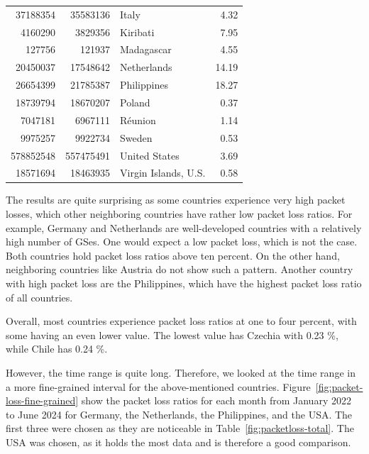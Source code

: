 \begin{table}
\begin{tabular}{rrlr}
		37188354  & 35583136  & Italy                       & 4.32   \\
		4160290   & 3829356   & Kiribati                    & 7.95   \\
		127756    & 121937    & Madagascar                  & 4.55   \\
		20450037  & 17548642  & Netherlands                 & 14.19  \\
		26654399  & 21785387  & Philippines                 & 18.27  \\
		18739794  & 18670207  & Poland                      & 0.37   \\
		7047181   & 6967111   & Réunion                     & 1.14   \\
		9975257   & 9922734   & Sweden                      & 0.53   \\
		578852548 & 557475491 & United States               & 3.69   \\
		18571694  & 18463935  & Virgin Islands, U.S.        & 0.58   \\
		\bottomrule
	\end{tabular}
\end{table}

The results are quite surprising as some countries experience very high packet
losses, which other neighboring countries have rather low packet loss ratios.
For example, Germany and Netherlands are well-developed countries with a
relatively high number of \ac{GS}es. One would expect a low packet loss, which
is not the case. Both countries hold packet loss ratios above ten percent. On
the other hand, neighboring countries like Austria do not show such a pattern.
Another country with high packet loss are the Philippines, which have the
highest packet loss ratio of all countries.

Overall, most countries experience packet loss ratios at one to four percent,
with some having an even lower value. The lowest value has Czechia with 0.23
\%, while Chile has 0.24 \%.

However, the time range is quite long. Therefore, we looked at the time range
in a more fine-grained interval for the above-mentioned countries.
Figure~\ref{fig:packet-loss-fine-grained} show the packet loss ratios for each
month from January 2022 to June 2024 for Germany, the Netherlands, the
Philippines, and the USA. The first three were chosen as they are noticeable in
Table~\ref{fig:packetloss-total}. The USA was chosen, as it holds the most data
and is therefore a good comparison.

